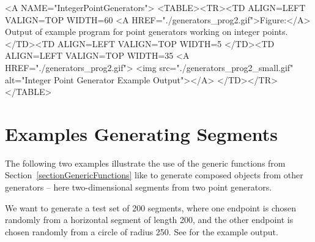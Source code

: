 
\begin{ccHtmlOnly}
  <A NAME="IntegerPointGenerators">
  <TABLE><TR><TD ALIGN=LEFT VALIGN=TOP WIDTH=60%
    <A HREF="./generators_prog2.gif">Figure:</A>
        Output of example program for point generators working
        on integer points.
  </TD><TD ALIGN=LEFT VALIGN=TOP WIDTH=5%
  </TD><TD ALIGN=LEFT VALIGN=TOP WIDTH=35%
    <A HREF="./generators_prog2.gif">
        <img src="./generators_prog2_small.gif" 
             alt="Integer Point Generator Example Output"></A>
  </TD></TR></TABLE>
\end{ccHtmlOnly}%



\section{Examples Generating Segments\label{sec:segment_example}}

The following two examples illustrate the use of the generic functions
from Section~\ref{sectionGenericFunctions} like
%
 to generate 
composed objects from other
generators -- here two-dimensional segments from two point generators.

We want to generate a test set of 200 segments, where one endpoint is
chosen randomly from a horizontal segment of length 200, and the other
endpoint is chosen randomly from a circle of radius 250. See
 for the example
output.


